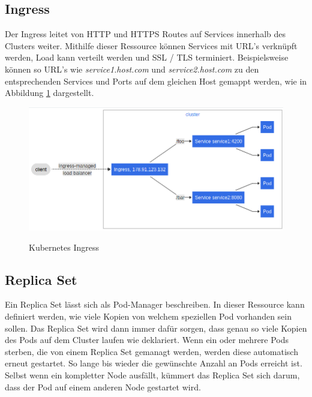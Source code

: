 \subsection{Ingress}
Der Ingress leitet von \ac{HTTP} und \ac{HTTPS} Routes auf Services innerhalb des Clusters weiter.
Mithilfe dieser Ressource können Services mit \ac{URL}'s verknüpft werden, Load kann verteilt werden und \ac{SSL} / \ac{TLS} terminiert.
Beispielsweise können so \ac{URL}'s wie \textit{service1.host.com} und \textit{service2.host.com} zu den entsprechenden Services und Ports auf dem gleichen Host gemappt werden, wie in Abbildung \ref{fig:ingress} dargestellt.
\cite{kubernetes_ingress}
\begin{figure}[ht]
        \caption{Kubernetes Ingress\cite{kubernetes_ingress}}
        \centering
        \includegraphics[width=\textwidth]{bilder/kubernetes_ingress.png}
        \label{fig:ingress}
\end{figure}

\subsection{Replica Set}
Ein Replica Set lässt sich als Pod-Manager beschreiben. 
In dieser Ressource kann definiert werden, wie viele Kopien von welchem speziellen Pod vorhanden sein sollen.
Das Replica Set wird dann immer dafür sorgen, dass genau so viele Kopien des Pods auf dem Cluster laufen wie deklariert. 
Wenn ein oder mehrere Pods sterben, die von einem Replica Set gemanagt werden, werden diese automatisch erneut gestartet. 
So lange bis wieder die gewünschte Anzahl an Pods erreicht ist.
Selbst wenn ein kompletter Node ausfällt, kümmert das Replica Set sich darum, dass der Pod auf einem anderen Node gestartet wird.
\cite[S.103 ff.]{Kubernetes_up_and_running}

